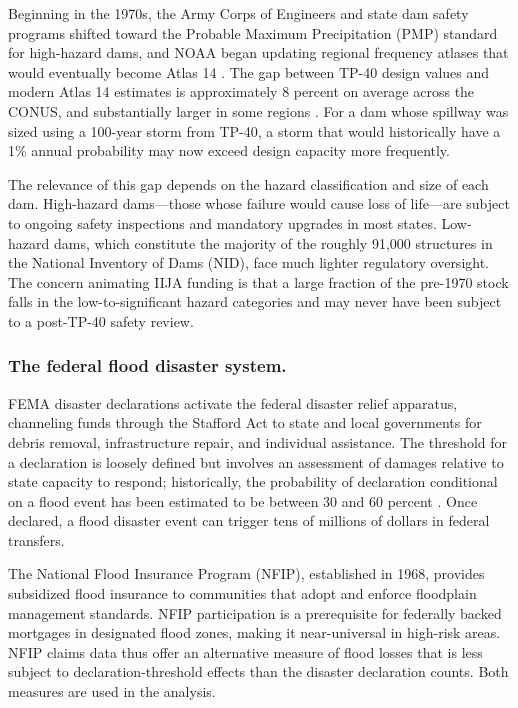 \documentclass[12pt]{article}
\begin{document}
Beginning in the 1970s, the Army Corps of Engineers and state dam safety programs shifted toward the Probable Maximum Precipitation (PMP) standard for high-hazard dams, and NOAA began updating regional frequency atlases that would eventually become Atlas 14 \citep{noaaatlas2013}. The gap between TP-40 design values and modern Atlas 14 estimates is approximately 8 percent on average across the CONUS, and substantially larger in some regions \citep{kunkel1999}. For a dam whose spillway was sized using a 100-year storm from TP-40, a storm that would historically have a 1\% annual probability may now exceed design capacity more frequently.

The relevance of this gap depends on the hazard classification and size of each dam. High-hazard dams---those whose failure would cause loss of life---are subject to ongoing safety inspections and mandatory upgrades in most states. Low-hazard dams, which constitute the majority of the roughly 91,000 structures in the National Inventory of Dams (NID), face much lighter regulatory oversight. The concern animating IIJA funding is that a large fraction of the pre-1970 stock falls in the low-to-significant hazard categories and may never have been subject to a post-TP-40 safety review.

\subsubsection*{The federal flood disaster system.}

FEMA disaster declarations activate the federal disaster relief apparatus, channeling funds through the Stafford Act to state and local governments for debris removal, infrastructure repair, and individual assistance. The threshold for a declaration is loosely defined but involves an assessment of damages relative to state capacity to respond; historically, the probability of declaration conditional on a flood event has been estimated to be between 30 and 60 percent \citep{deryugina2017}. Once declared, a flood disaster event can trigger tens of millions of dollars in federal transfers.

The National Flood Insurance Program (NFIP), established in 1968, provides subsidized flood insurance to communities that adopt and enforce floodplain management standards. NFIP participation is a prerequisite for federally backed mortgages in designated flood zones, making it near-universal in high-risk areas. NFIP claims data thus offer an alternative measure of flood losses that is less subject to declaration-threshold effects than the disaster declaration counts. Both measures are used in the analysis.
\end{document}
